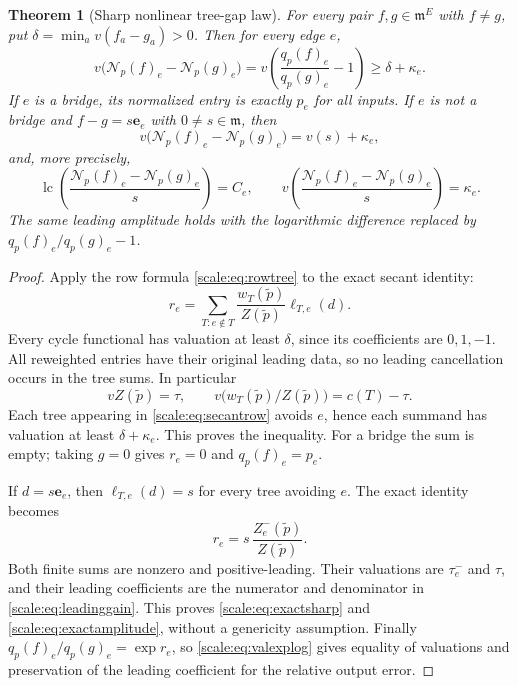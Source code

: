 \documentclass[11pt,a4paper]{article}
\numberwithin{equation}{section}
\newtheorem{theorem}{Theorem}[section]
\theoremstyle{definition}
\newcommand{\mm}{\mathfrak m}
\newcommand{\NN}{\mathcal N}
\newcommand{\lc}{\operatorname{lc}}
\begin{document}
\begin{theorem}[Sharp nonlinear tree-gap law]\label{scale:thm:sharp}
For every pair $f,g\in\mm^E$ with $f\ne g$, put
$\delta=\min_a v(f_a-g_a)>0$. Then for every edge $e$,
\begin{equation}\label{scale:eq:sharpbound}
 v\bigl(\NN_p(f)_e-\NN_p(g)_e\bigr)
 =v\!\left(\frac{q_p(f)_e}{q_p(g)_e}-1\right)
 \geq\delta+\kappa_e.
\end{equation}
If $e$ is a bridge, its normalized entry is exactly $p_e$ for all
inputs. If $e$ is not a bridge and $f-g=s\mathbf e_e$ with
$0\ne s\in\mm$, then
\begin{equation}\label{scale:eq:exactsharp}
 v\bigl(\NN_p(f)_e-\NN_p(g)_e\bigr)=v(s)+\kappa_e,
\end{equation}
and, more precisely,
\begin{equation}\label{scale:eq:exactamplitude}
 \lc\!\left(
   \frac{\NN_p(f)_e-\NN_p(g)_e}{s}\right)=C_e,
 \qquad
 v\!\left(
   \frac{\NN_p(f)_e-\NN_p(g)_e}{s}\right)=\kappa_e.
\end{equation}
The same leading amplitude holds with the logarithmic difference
replaced by $q_p(f)_e/q_p(g)_e-1$.
\end{theorem}
\begin{proof}
Apply the row formula \eqref{scale:eq:rowtree} to the exact secant
identity:
\begin{equation}\label{scale:eq:secantrow}
 r_e=\sum_{T:e\notin T}
       \frac{w_T(\widetilde p)}{Z(\widetilde p)}\ell_{T,e}(d).
\end{equation}
Every cycle functional has valuation at least $\delta$, since its
coefficients are $0,1,-1$. All reweighted entries have their original
leading data, so no leading cancellation occurs in the tree sums.
In particular
\[
 v Z(\widetilde p)=\tau,\qquad
 v\bigl(w_T(\widetilde p)/Z(\widetilde p)\bigr)=c(T)-\tau.
\]
Each tree appearing in \eqref{scale:eq:secantrow} avoids $e$, hence
each summand has valuation at least $\delta+\kappa_e$.
This proves the inequality. For a bridge the sum is empty; taking
$g=0$ gives $r_e=0$ and $q_p(f)_e=p_e$.

If $d=s\mathbf e_e$, then $\ell_{T,e}(d)=s$ for every tree avoiding
$e$. The exact identity becomes
\begin{equation}\label{scale:eq:owncoordinate}
 r_e=s\,\frac{Z_e^-(\widetilde p)}{Z(\widetilde p)}.
\end{equation}
Both finite sums are nonzero and positive-leading. Their valuations
are $\tau_e^-$ and $\tau$, and their leading coefficients are the
numerator and denominator in \eqref{scale:eq:leadinggain}. This proves
\eqref{scale:eq:exactsharp} and \eqref{scale:eq:exactamplitude}, without
a genericity assumption. Finally $q_p(f)_e/q_p(g)_e=\exp r_e$, so
\eqref{scale:eq:valexplog} gives equality of valuations and preservation
of the leading coefficient for the relative output error.
\end{proof}
\end{document}

